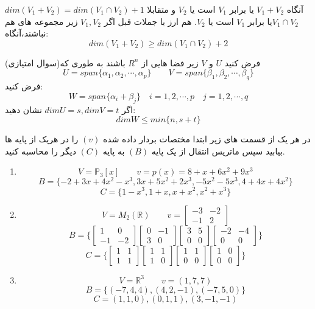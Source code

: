\documentclass{article}
\begin{document}
$dim(V_1+V_2)=dim(V_1\cap V_2)+1$
آنگاه 
$V_1+V_2$
یا برابر 
$V_1$
است یا 
$V_2$
و متقابلا 
$V_1\cap V_2 $یا برابر 
$V_1$
است یا 
$V_2$.
هم ارز با جملات قبل اگر 
$V_1,V_2$
زیر مجموعه های هم نباشند،آنگاه:
$$dim(V_1+V_2)\geq dim(V_1\cap V_2)+2$$

(سوال امتیازی)فرض کنید 
$U$
و
$V$
زیر فضا هایی از 
$R^n$
باشند به طوری که 
$$U=span\{\alpha_1,\alpha_2,\cdots,\alpha_p\}\qquad V=span\{\beta_1,\beta_2,\cdots,\beta_q\}$$
فرض کنید:
$$W=span\{\alpha_i+\beta_j\}\quad i=1,2,\cdots,p \quad j=1,2,\cdots,q$$
اگر 
$dimU=s, dim V=t$
نشان دهید:
$$dimW\leq min\{n,s+t\}$$


 در هر یک از قسمت های زیر ابتدا مختصات بردار داده شده
$(v)$ 
را در هریک از پایه ها بیابید سپس ماتریس انتقال از یک پایه
$(B)$
به پایه
$(C)$
دیگر را محاسبه کنید.
\begin{enumerate}
	\item 
	$$V=\mathbb{P}_3[x]\qquad v=p(x)=8+x+6x^2+9x^3$$
	$$B=\{−2+3x+4x^2-x^3, 3x+5x^2+2x^3, -5x^2-5x^3,
	4 + 4x + 4x^2\}$$
	$$C=\{1 - x^3, 1 + x, x + x^2, x^2 + x^3\}$$
	\item 
	$$V=M_2(\mathbb{R})\qquad v=\begin{bmatrix}
	-3&-2\\
	-1&2
	\end{bmatrix}
	$$
	$$B=\{
	\begin{bmatrix}
	1&0\\
	-1&-2
	\end{bmatrix}
	\begin{bmatrix}
	0&-1\\
	3&0
	\end{bmatrix}
	\begin{bmatrix}
	3&5\\
	0&0
	\end{bmatrix}
	\begin{bmatrix}
	-2&-4\\
	0&0
	\end{bmatrix}
	\}$$
	$$C=\{
	\begin{bmatrix}
	1&1\\
	1&1
	\end{bmatrix}
	\begin{bmatrix}
	1&1\\
	1&0
	\end{bmatrix}
	\begin{bmatrix}
	1&1\\
	0&0
	\end{bmatrix}
	\begin{bmatrix}
	1&0\\
	0&0
	\end{bmatrix}
	\}$$
	\item
	$$V=\mathbb{R}^3\qquad v=(1,7,7)$$
	$$B=\{(-7,4,4),(4,2,-1),(-7,5,0)\}$$
	$$C={(1,1,0),(0,1,1),(3,-1,-1)}$$
\end{enumerate}
\end{document}
